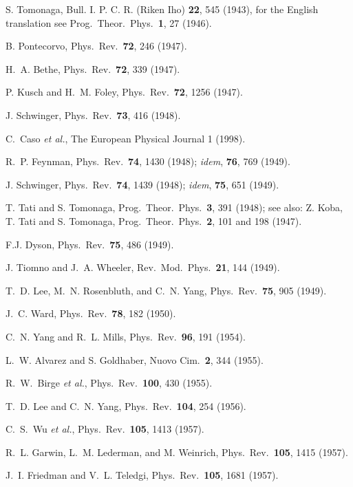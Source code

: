 \documentclass[12pt]{report}
\begin{document}
\begin{thebibliography}{100}
S. Tomonaga, Bull. I. P. C. R. (Riken Iho) {\bf 22},  545  (1943), for the
  English translation see Prog.\ Theor.\ Phys.\, {\bf 1}, 27 (1946).

B. Pontecorvo, Phys.\ Rev.\ {\bf 72},  246  (1947).

H.~A. Bethe, Phys.\ Rev.\ {\bf 72},  339  (1947).

P. Kusch and H.~M. Foley, Phys.\ Rev.\ {\bf 72},  1256  (1947).

J. Schwinger, Phys.\ Rev.\ {\bf 73},  416  (1948).

C.~Caso {\it et al.}, The European Physical Journal  1  (1998).

R.~P. Feynman, Phys.\ Rev.\ {\bf 74},  1430  (1948); {\it idem}, {\bf 76}, 769
  (1949).

J. Schwinger, Phys.\ Rev.\ {\bf 74},  1439  (1948); {\it idem}, {\bf 75}, 651
  (1949).

T. Tati and S. Tomonaga, Prog.\ Theor.\ Phys.\ {\bf 3},  391  (1948); see also:
  Z. Koba, T. Tati and S. Tomonaga, Prog.\ Theor.\ Phys.\ {\bf 2}, 101 and 198
  (1947).

F.J. Dyson, Phys.\ Rev.\ {\bf 75},  486  (1949).

J. Tiomno and J.~A. Wheeler, Rev.\ Mod.\ Phys.\ {\bf 21},  144  (1949).

T.~D. Lee, M.~N. Rosenbluth, and C.~N. Yang, Phys.\ Rev.\ {\bf 75},  905
  (1949).

J.~C. Ward, Phys.\ Rev.\ {\bf 78},  182  (1950).

C.~N. Yang and R.~L. Mills, Phys.\ Rev.\ {\bf 96},  191  (1954).

L.~W. Alvarez and S. Goldhaber, Nuovo Cim.\ {\bf 2},  344  (1955).

R.~W.~Birge {{\it et al.}}, Phys.\ Rev.\ {\bf 100},  430  (1955).

T.~D. Lee and C.~N. Yang, Phys.\ Rev.\ {\bf 104},  254  (1956).

C.~S.~Wu {{\it et al.}}, Phys.\ Rev.\ {\bf 105},  1413  (1957).

R.~L. Garwin, L.~M. Lederman, and M. Weinrich, Phys.\ Rev.\ {\bf 105},  1415
  (1957).

J.~I. Friedman and V.~L. Teledgi, Phys.\ Rev.\ {\bf 105},  1681  (1957).


\end{thebibliography}
\end{document}
